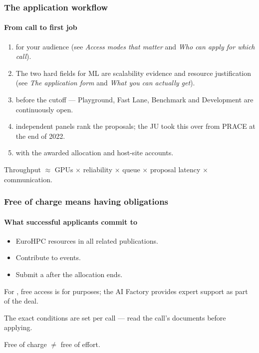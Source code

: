 \documentclass[10pt,aspectratio=169,notheorems]{beamer}
\begin{document}
\begin{frame}
    \frametitle{The application workflow}
    \framesubtitle{From call to first job}
    \begin{enumerate}
        \item {} for your audience (see \emph{Access modes that matter} and \emph{Who can apply for which call}).
        \item {} The two hard fields for ML are scalability evidence and resource justification (see \emph{The application form} and \emph{What you can actually get}).
        \item {} before the cutoff --- Playground, Fast Lane, Benchmark and Development are continuously open.
        \item {} independent panels rank the proposals; the JU took this over from PRACE at the end of 2022.
        \item {} with the awarded allocation and host-site accounts.
    \end{enumerate}

    \vspace{2em}
    \textcolor{SlidemintMuted}{Throughput $\approx$ GPUs $\times$ reliability $\times$ queue $\times$ proposal latency $\times$ communication.}
\end{frame}

\begin{frame}
    \frametitle{Free of charge means having obligations}
    \framesubtitle{What successful applicants commit to}
    \begin{itemize}
        \item {} EuroHPC resources in all related publications.
        \item Contribute to  events.
        \item Submit a  after the allocation ends.
    \end{itemize}

    \vspace{0.8em}
    For , free access is for  purposes; the AI Factory provides expert support as part of the deal.

    \vspace{0.8em}
    The exact conditions are set per call --- read the call's documents before applying.

    \vspace{1.5em}
    \textcolor{SlidemintMuted}{Free of charge $\neq$ free of effort.}
\end{frame}
\end{document}
